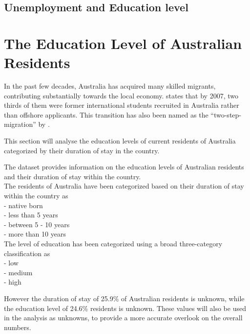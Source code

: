 \documentclass[11pt,a4paper,]{article}
\begin{document}
\subsection*{Unemployment and Education level}

\section* {The Education Level of Australian Residents}

In the past few decades, Australia has acquired many skilled migrants, contributing substantially towards the local economy. \textcite{hawthorne2010valuable} states that by 2007, two thirds of them were former international students recruited in Australia rather than offshore applicants. This transition has also been named as the ``two-step-migration'' by \textcite{hawthorne2010valuable}.

This section will analyse the education levels of current residents of Australia categorized by their duration of stay in the country.

The dataset provides information on the education levels of Australian residents and their duration of stay within the country.\\
The residents of Australia have been categorized based on their duration of stay within the country as\\
- native born\\
- less than 5 years\\
- between 5 - 10 years\\
- more than 10 years\\
The level of education has been categorized using a broad three-category classification as\\
- low\\
- medium\\
- high

However the duration of stay of 25.9\% of Australian residents is unknown, while the education level of 24.6\% residents is unknown. These values will also be used in the analysis as unknowns, to provide a more accurate overlook on the overall numbers.
\end{document}
